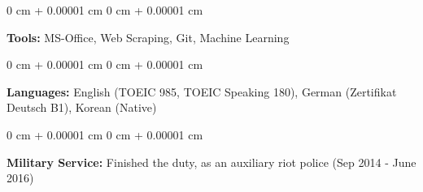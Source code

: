\documentclass[10pt, letterpaper]{article}
\newenvironment{onecolentry}{
    \begin{adjustwidth}{
        0 cm + 0.00001 cm
    }{
        0 cm + 0.00001 cm
    }
}{
    \end{adjustwidth}
} %
\begin{document}
        \vspace{0.2 cm}

        \begin{onecolentry}
            \textbf{Tools:} MS-Office, Web Scraping, Git, Machine Learning
        \end{onecolentry}

        \vspace{0.2 cm}

        \begin{onecolentry}
            \textbf{Languages:} English (TOEIC 985, TOEIC Speaking 180), German (Zertifikat Deutsch B1), Korean (Native)
        \end{onecolentry}

        \vspace{0.2 cm}

        \begin{onecolentry}
            \textbf{Military Service:} Finished the duty, as an auxiliary riot police (Sep 2014 - June 2016)
        \end{onecolentry}


    
\end{document}
